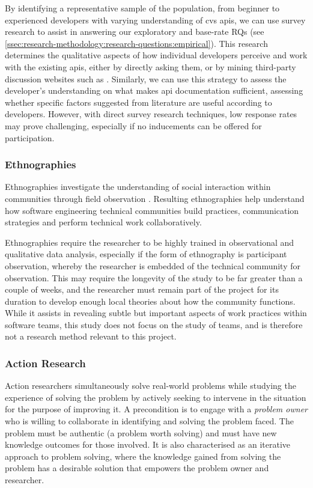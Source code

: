 By identifying a representative sample of the population, from beginner to experienced developers with varying understanding of \gls{cvs} \glspl{api}, we can use survey research to assist in answering our exploratory and base-rate RQs (see \cref{ssec:research-methodology:research-questions:empirical}). This research determines the qualitative aspects of how individual developers perceive and work with the existing \glspl{api}, either by directly asking them, or by mining third-party discussion websites such as . Similarly, we can use this strategy to assess the developer's understanding on what makes \gls{api} documentation sufficient, assessing whether specific factors suggested from literature are useful according to developers. However, with direct survey research techniques, low response rates may prove challenging, especially if no inducements can be offered for participation.

\subsubsection{Ethnographies}
Ethnographies investigate the understanding of social interaction within communities through field observation \citep{Robinson:2007tp}. Resulting ethnographies help understand how software engineering technical communities build practices, communication strategies and perform technical work collaboratively.

Ethnographies require the researcher to be highly trained in observational and qualitative data analysis, especially if the form of ethnography is participant observation, whereby the researcher is embedded of the technical community for observation. This may require the longevity of the study to be far greater than a couple of weeks, and the researcher must remain part of the project for its duration to develop enough local theories about how the community functions. While it assists in revealing subtle but important aspects of work practices within software teams, this study does not focus on the study of teams, and is therefore not a research method relevant to this project.


\subsubsection{Action Research}
Action researchers simultaneously solve real-world problems while studying the experience of solving the problem \citep{Davison:2004wo} by actively seeking to intervene in the situation for the purpose of improving it. A precondition is to engage with a \textit{problem owner} who is willing to collaborate in identifying and solving the problem faced. The problem must be authentic (a problem worth solving) and must have new knowledge outcomes for those involved. It is also characterised as an iterative approach to problem solving, where the knowledge gained from solving the problem has a desirable solution that empowers the problem owner and researcher.

